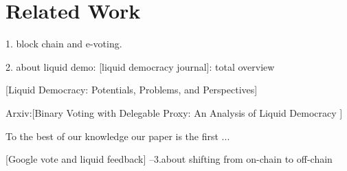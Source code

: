 \section{Related Work}
1. block chain and e-voting. 

2. about liquid demo: [liquid democracy journal]: total overview

[Liquid Democracy: Potentials, Problems, and Perspectives]

Arxiv:[Binary Voting with Delegable Proxy: An Analysis of Liquid Democracy ]

To the best of our knowledge our paper is the first ...

[Google vote and liquid feedback]
--3.about shifting from on-chain to off-chain 